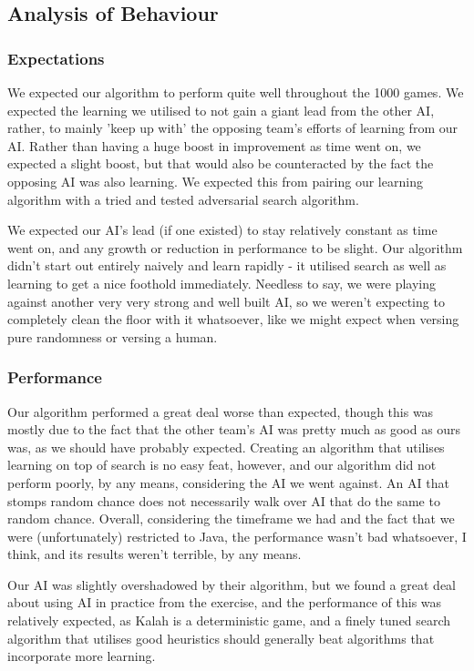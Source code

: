 \documentclass[11pt]{article}
\begin{document}
\subsection{Analysis of Behaviour}
\label{sec-3-3}

\subsubsection{Expectations}
\label{sec-3-3-1}

We expected our algorithm to perform quite well throughout the 1000 games. We expected the learning we utilised to not gain a giant lead from the other AI, rather, to mainly 'keep up with' the opposing team's efforts of learning from our AI. Rather than having a huge boost in improvement as time went on, we expected a slight boost, but that would also be counteracted by the fact the opposing AI was also learning. We expected this from pairing our learning algorithm with a tried and tested adversarial search algorithm.

We expected our AI's lead (if one existed) to stay relatively constant as time went on, and any growth or reduction in performance to be slight. Our algorithm didn't start out entirely naively and learn rapidly - it utilised search as well as learning to get a nice foothold immediately. Needless to say, we were playing against another very very strong and well built AI, so we weren't expecting to completely clean the floor with it whatsoever, like we might expect when versing pure randomness or versing a human.
\subsubsection{Performance}
\label{sec-3-3-2}

Our algorithm performed a great deal worse than expected, though this was mostly due to the fact that the other team's AI was pretty much as good as ours was, as we should have probably expected. Creating an algorithm that utilises learning on top of search is no easy feat, however, and our algorithm did not perform poorly, by any means, considering the AI we went against. An AI that stomps random chance does not necessarily walk over AI that do the same to random chance. Overall, considering the timeframe we had and the fact that we were (unfortunately) restricted to Java, the performance wasn't bad whatsoever, I think, and its results weren't terrible, by any means.

Our AI was slightly overshadowed by their algorithm, but we found a great deal about using AI in practice from the exercise, and the performance of this was relatively expected, as Kalah is a deterministic game, and a finely tuned search algorithm that utilises good heuristics should generally beat algorithms that incorporate more learning.
\end{document}
